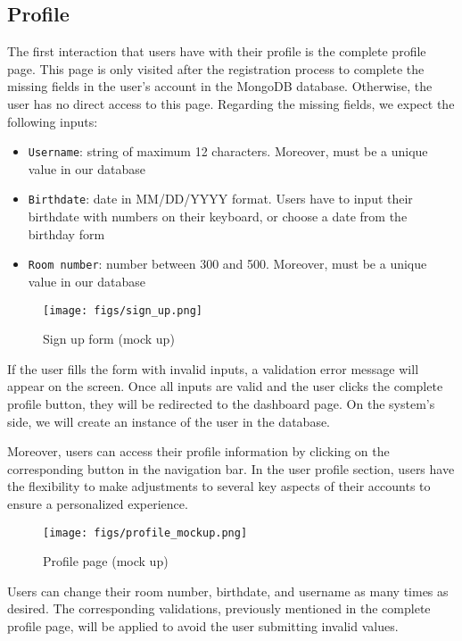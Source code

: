 \documentclass[conference]{IEEEtran}
\begin{document}
\subsection{Profile}
The first interaction that users have with their profile is the complete profile page. This page is only visited after the registration process to complete the missing fields in the user’s account in the MongoDB database. Otherwise, the user has no direct access to this page. Regarding the missing fields, we expect the following inputs:
\begin{itemize}
    \item \texttt{Username}: string of maximum 12 characters. Moreover, must be a unique value in our database
    \item \texttt{Birthdate}: date in MM/DD/YYYY format. Users have to input their birthdate with numbers on their keyboard, or choose a date from the birthday form
    \item \texttt{Room number}: number between 300 and 500. Moreover, must be a unique value in our database
\end{itemize}
\begin{figure}[H]
\centering
\texttt{[image: figs/sign\_up.png]}
\caption{Sign up form (mock up)}
\label{fig:Sign up form}
\end{figure}
If the user fills the form with invalid inputs, a validation error message will appear on the screen. Once all inputs are valid and the user clicks the complete profile button, they will be redirected to the dashboard page. On the system’s side, we will create an instance of the user in the database.

Moreover, users can access their profile information by clicking on the corresponding button in the navigation bar. In the user profile section, users have the flexibility to make adjustments to several key aspects of their accounts to ensure a personalized experience.
\begin{figure}[H]
\centering
\texttt{[image: figs/profile\_mockup.png]}
\caption{Profile page (mock up)}
\label{fig:Profile mockup}
\end{figure}
Users can change their room number, birthdate, and username as many times as desired. The corresponding validations, previously mentioned in the complete profile page, will be applied to avoid the user submitting invalid values.
\end{document}
